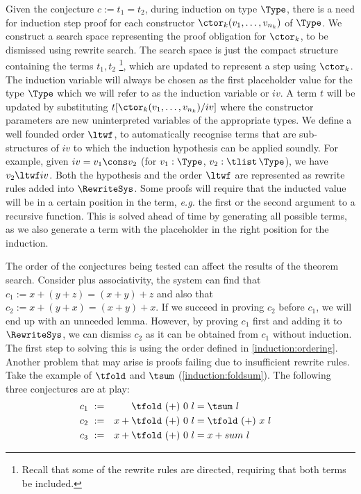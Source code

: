 Given the conjecture $c := t_1 = t_2$, during induction on type $\Type$, there is a need for induction step proof for each constructor $\ctor_k(v_1, \ldots, v_{n_k})$ of $\Type$.
We construct a search space representing the proof obligation for $\ctor_k$, to be dismissed using rewrite search.
The search space is just the compact structure containing the terms $t_1, t_2$ \footnote{Recall that some of the rewrite rules are directed, requiring that both terms be included.}, which are updated to represent a step using $\ctor_k$.
The induction variable will always be chosen as the first placeholder value for the type $\Type$ which we will refer to as the induction variable or $iv$.
A term $t$ will be updated by substituting $t[\ctor_k(v_1, \ldots, v_{n_k})/iv]$ where the constructor parameters are new uninterpreted variables of the appropriate types.
We define a well founded order $\ltwf$, to automatically recognise terms that are sub-structures of $iv$ to
which the induction hypothesis can be applied soundly.
For example, given $iv = v_1 \cons v_2$ (for $v_1 : \Type$, $v_2 : \tlist\,\Type$), we have $v_2 \ltwf iv$.
Both the hypothesis and the order $\ltwf$ are represented as rewrite rules added into $\RewriteSys$.
Some proofs will require that the inducted value will be in a certain position in the term, \textit{e.g.} the first or the second argument
to a recursive function. 
This is solved ahead of time by generating all possible terms, as we also generate a term with the placeholder in the right position for the induction.

The order of the conjectures being tested can affect the results of the theorem search.
Consider plus associativity, the system can find that $c_1 := x + (y + z) = (x + y) + z$ and also that $c_2 := x + (y + x) = (x + y) + x$.
If we succeed in proving $c_2$ before $c_1$, we will end up with an unneeded lemma.
However, by proving $c_1$ first and adding it to $\RewriteSys$, we can dismiss $c_2$ as it can be obtained from $c_1$ without induction.
The first step to solving this is using the order defined in \autoref{induction:ordering}.
Another problem that may arise is proofs failing due to insufficient rewrite rules.
Take the example of $\tfold$ and $\tsum$ (\autoref{induction:foldsum}).
The following three conjectures are at play:
%
\begin{align}
\label{induction:conjfoldsum}    
 c_1 &~:= & \tfold ~ (+) ~ 0 ~ l &= \tsum ~ l     & & \\
 c_2 &~:= & x + \tfold ~ (+) ~ 0 ~ l &= \tfold ~ (+) ~ x ~ l  & & \nonumber \\
 c_3 &~:= & x + \tfold ~ (+) ~ 0 ~ l &= x + sum ~ l   & & \nonumber
\end{align}

